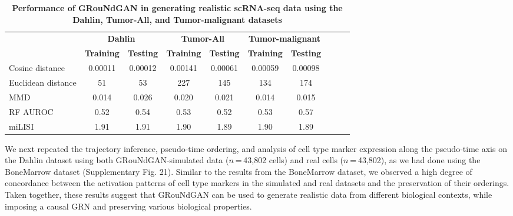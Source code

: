 \begin{table}[!t]
	\caption[Performance of GRouNdGAN in generating realistic scRNA-seq data using the Dahlin, Tumor-All, and Tumor-malignant datasets]{\textsf{\textbf{Performance of GRouNdGAN in generating realistic scRNA-seq data using the Dahlin, Tumor-All, and Tumor-malignant datasets}} \label{tab:table3}}
	\begin{tabular}{@{}lccccccccc@{}}
		\toprule
		\textbf{ } & \multicolumn{2}{c}{\textbf{Dahlin}} & \multicolumn{2}{c}{\textbf{Tumor-All}} & \multicolumn{2}{c}{\textbf{Tumor-malignant}} \\
		\cmidrule(lr){2-3} \cmidrule(lr){4-5} \cmidrule(lr){6-7}
		& \textbf{Training} & \textbf{Testing} & \textbf{Training} & \textbf{Testing} & \textbf{Training} & \textbf{Testing} \\
		\midrule
		Cosine distance       & 0.00011 & 0.00012 & 0.00141 & 0.00061 & 0.00059 & 0.00098 \\
		Euclidean distance    & 51      & 53      & 227     & 145     & 134     & 174     \\
		MMD                   & 0.014   & 0.026   & 0.020   & 0.021   & 0.014   & 0.015   \\
		RF AUROC              & 0.52             & 0.54    & 0.53    & 0.52    & 0.53    & 0.57    \\
		miLISI                & 1.91             & 1.91    & 1.90    & 1.89    & 1.90    & 1.89    \\
		\bottomrule
	\end{tabular}
\end{table}

We next repeated the trajectory inference, pseudo-time ordering, and analysis of cell type marker expression along the pseudo-time axis on the Dahlin dataset using both GRouNdGAN-simulated data ($n$ = 43,802 cells) and real cells ($n$ = 43,802), as we had done using the BoneMarrow dataset (Supplementary Fig. 21). Similar to the results from the BoneMarrow dataset, we observed a high degree of concordance between the activation patterns of cell type markers in the simulated and real datasets and the preservation of their orderings. Taken together, these results suggest that GRouNdGAN can be used to generate realistic data from different biological contexts, while imposing a causal GRN and preserving various biological properties.

